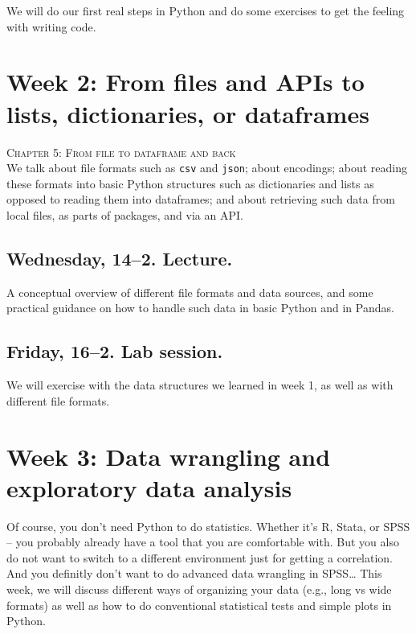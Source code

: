 We will do our first real steps in Python and do some exercises to get the feeling with writing code.



\section*{Week 2: From files and APIs to lists, dictionaries, or dataframes}
\textsc{ Chapter 5: From file to dataframe and back}\\

We talk about file formats such as \texttt{csv} and \texttt{json}; about encodings; about reading these formats into basic Python structures such as dictionaries and lists as opposed to reading them into dataframes; and about retrieving such data from local files, as parts of packages, and via an API.

\subsection*{Wednesday, 14--2. Lecture.}
A conceptual overview of different file formats and data sources, and some practical guidance on how to handle such data in basic Python and in Pandas.


\subsection*{Friday, 16--2. Lab session.}
We will exercise with the data structures we learned in week 1, as well as with different file formats.



\section*{Week 3: Data wrangling and exploratory data analysis}
Of course, you don't need Python to do statistics. Whether it's R, Stata, or SPSS -- you probably already have a tool that you are comfortable with. But you also do not want to switch to a different environment just for getting a correlation. And you definitly don't want to do advanced data wrangling in SPSS\ldots
This week, we will discuss different ways of organizing your data (e.g., long vs wide formats) as well as how to do conventional statistical tests and simple plots in Python.


